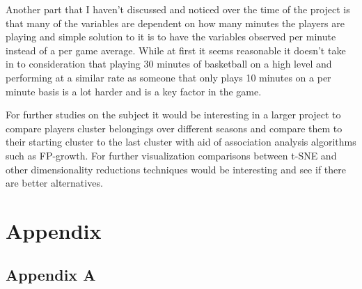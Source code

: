 \documentclass{article}
\begin{document}
Another part that I haven’t discussed and noticed over the time of the project is that many of the variables are dependent on how many minutes the players are playing and simple solution to it is to have the variables observed per minute instead of a per game average. While at first it seems reasonable it doesn't take in to consideration that playing 30 minutes of basketball on a high level and performing at a similar rate as someone that only plays 10 minutes on a per minute basis is a lot harder and is a key factor in the game.

For further studies on the subject it would be interesting in a larger project to compare players cluster belongings over different seasons and compare them to their starting cluster to the last cluster with aid of association analysis algorithms such as FP-growth. For further visualization comparisons between t-SNE and other dimensionality reductions techniques would be interesting and see if there are better alternatives.







\newpage

\section{Appendix}
\subsection{Appendix A}
\end{document}
